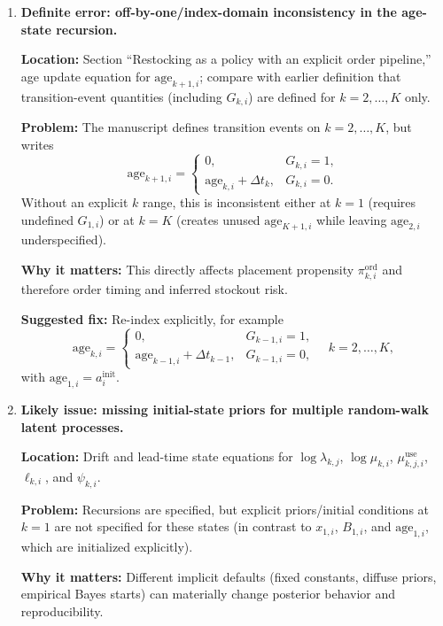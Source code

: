 \documentclass[11pt]{article}
\begin{document}
\begin{enumerate}
  \item \textbf{Definite error: off-by-one/index-domain inconsistency in the age-state recursion.}

  \textbf{Location:} Section ``Restocking as a policy with an explicit order pipeline,'' age update equation for $\text{age}_{k+1,i}$; compare with earlier definition that transition-event quantities (including $G_{k,i}$) are defined for $k=2,\dots,K$ only.

  \textbf{Problem:} The manuscript defines transition events on $k=2,\dots,K$, but writes
  \[
    \text{age}_{k+1,i}=\begin{cases}
      0,& G_{k,i}=1,\\
      \text{age}_{k,i}+\Delta t_k,& G_{k,i}=0.
    \end{cases}
  \]
  Without an explicit $k$ range, this is inconsistent either at $k=1$ (requires undefined $G_{1,i}$) or at $k=K$ (creates unused $\text{age}_{K+1,i}$ while leaving $\text{age}_{2,i}$ underspecified).

  \textbf{Why it matters:} This directly affects placement propensity $\pi^{\mathrm{ord}}_{k,i}$ and therefore order timing and inferred stockout risk.

  \textbf{Suggested fix:} Re-index explicitly, for example
  \[
    \text{age}_{k,i}=\begin{cases}
      0,& G_{k-1,i}=1,\\
      \text{age}_{k-1,i}+\Delta t_{k-1},& G_{k-1,i}=0,
    \end{cases}\quad k=2,\dots,K,
  \]
  with $\text{age}_{1,i}=a_i^{\mathrm{init}}$.

  \item \textbf{Likely issue: missing initial-state priors for multiple random-walk latent processes.}

  \textbf{Location:} Drift and lead-time state equations for $\log\lambda_{k,j}$, $\log\mu_{k,i}$, $\mu^{\mathrm{use}}_{k,j,i}$, $\ell_{k,i}$, and $\psi_{k,i}$.

  \textbf{Problem:} Recursions are specified, but explicit priors/initial conditions at $k=1$ are not specified for these states (in contrast to $x_{1,i}$, $B_{1,i}$, and $\text{age}_{1,i}$, which are initialized explicitly).

  \textbf{Why it matters:} Different implicit defaults (fixed constants, diffuse priors, empirical Bayes starts) can materially change posterior behavior and reproducibility.


\end{enumerate}
\end{document}
